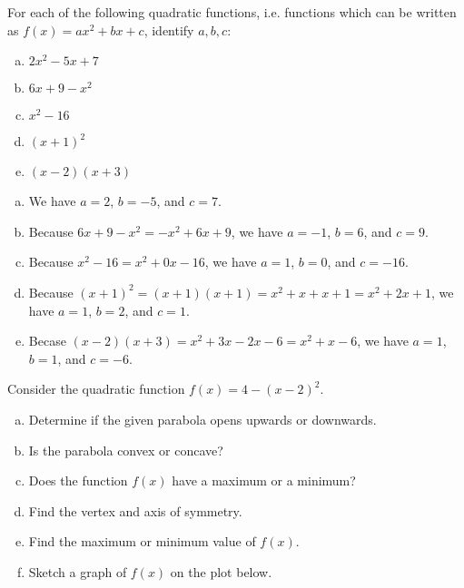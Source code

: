 \documentclass[11pt,letterpaper]{article}
\begin{document}

 For each of the following quadratic functions, i.e. functions which can be written as $f(x)= ax^2 + bx + c$, identify $a, b, c$:
	\begin{enumerate}[(a)]
	\item $2x^2 - 5x + 7$
	\item $6x + 9 - x^2$
	\item $x^2 - 16$
	\item $(x + 1)^2$
	\item $(x - 2)(x + 3)$
	\end{enumerate} \pspace

\sol 
\begin{enumerate}[(a)]
\item We have $a= 2$, $b= -5$, and $c= 7$. \pspace

\item Because $6x + 9 - x^2= -x^2 + 6x + 9$, we have $a= -1$, $b= 6$, and $c= 9$. \pspace

\item Because $x^2 - 16= x^2 + 0x - 16$, we have $a= 1$, $b= 0$, and $c= -16$. \pspace

\item Because $(x + 1)^2= (x + 1)(x + 1)= x^2 + x + x + 1= x^2 + 2x + 1$, we have $a= 1$, $b= 2$, and $c= 1$. \pspace

\item Becase $(x - 2)(x + 3)= x^2 + 3x - 2x - 6= x^2 + x - 6$, we have $a= 1$, $b= 1$, and $c= -6$. 
\end{enumerate}



\newpage



 Consider the quadratic function $f(x)= 4 - (x - 2)^2$.
	\begin{enumerate}[(a)]
	\item Determine if the given parabola opens upwards or downwards.
	\item Is the parabola convex or concave?
	\item Does the function $f(x)$ have a maximum or a minimum?
	\item Find the vertex and axis of symmetry. 
	\item Find the maximum or minimum value of $f(x)$. 
	\item Sketch a graph of $f(x)$ on the plot below. 
	\end{enumerate} \pspace
\end{document}
